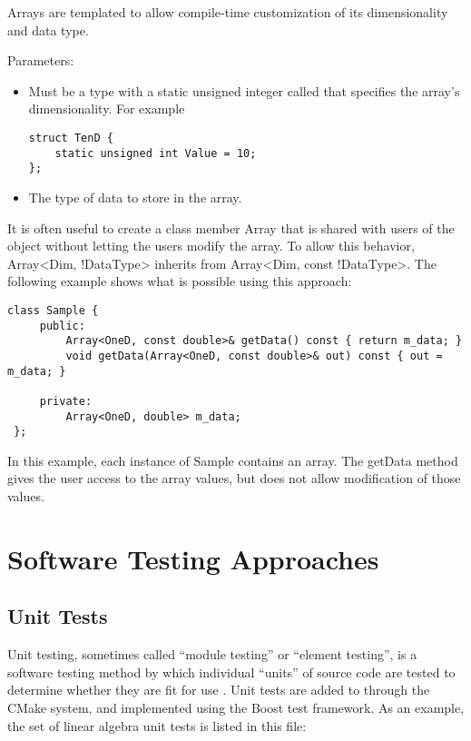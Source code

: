 Arrays are templated to allow compile-time customization of its dimensionality
and data type.

Parameters:
\begin{itemize}
\item {} Must be a type with a static unsigned integer called
 that specifies the array's dimensionality. For example
\begin{lstlisting}[style=C++Style]
struct TenD {
    static unsigned int Value = 10;
};
\end{lstlisting}
\item {} The type of data to store in the array.
\end{itemize}

It is often useful to create a class member Array that is shared with users of
the object without letting the users modify the array. To allow this behavior,
Array<Dim, !DataType> inherits from Array<Dim, const !DataType>. The following
example shows what is possible using this approach:
\begin{lstlisting}[style=C++Style]
 class Sample {
     public:
         Array<OneD, const double>& getData() const { return m_data; }
         void getData(Array<OneD, const double>& out) const { out = m_data; }

     private:
         Array<OneD, double> m_data;
 };
\end{lstlisting}
In this example, each instance of Sample contains an array. The getData
method gives the user access to the array values, but does not allow
modification of those values.


\section{Software Testing Approaches}

\subsection{Unit Tests}

Unit testing, sometimes called ``module testing'' or ``element testing'', is a
software testing method by which individual ``units'' of source code
are tested to determine whether they are fit for use
\cite{KFN-testing}.  Unit tests are added to {\nek} through the
CMake system, and implemented using the Boost test framework.
As an example, the set of linear algebra unit tests is
listed in this file: \\

